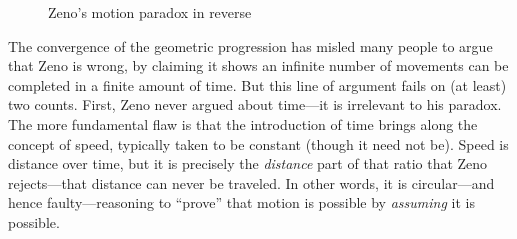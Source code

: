 \begin{figure}[ht]
\centering
{}
\caption[]{\enskip Zeno's motion paradox in reverse}
\label{fig:zenoreverse}
\end{figure}

The convergence of the geometric progression has misled many people to argue
that Zeno is wrong, by claiming it shows an infinite number of movements
can be completed in a finite amount of time. But this line of argument fails on
(at least) two counts. First, Zeno never argued about time---it is irrelevant to
his paradox. The more fundamental flaw is that the introduction of time brings
along the concept of speed, typically taken to be constant (though it need not
be). Speed is distance over time, but it is precisely the \emph{distance} part
of that ratio that Zeno rejects---that distance can never be traveled. In other
words, it is circular---and hence faulty---reasoning to ``prove'' that motion is
possible by \emph{assuming} it is possible.

